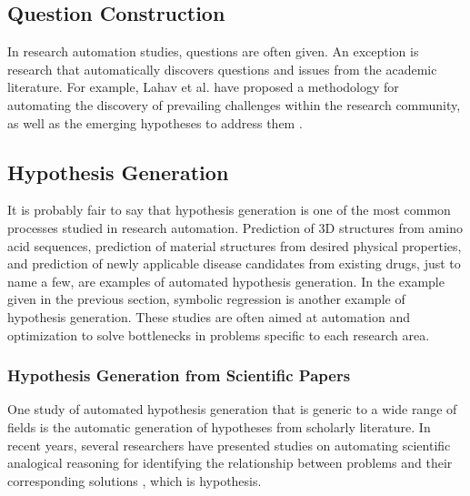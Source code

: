 
\subsection{Question Construction}
In research automation studies, questions are often given. An exception is research that automatically discovers questions and issues from the academic literature. For example, Lahav et al. have proposed a methodology for automating the discovery of prevailing challenges within the research community, as well as the emerging hypotheses to address them \cite{lahav2022search}.

\subsection{Hypothesis Generation}
It is probably fair to say that hypothesis generation is one of the most common processes studied in research automation. Prediction of 3D structures from amino acid sequences, prediction of material structures from desired physical properties, and prediction of newly applicable disease candidates from existing drugs, just to name a few, are examples of automated hypothesis generation. In the example given in the previous section, symbolic regression is another example of hypothesis generation. These studies are often aimed at automation and optimization to solve bottlenecks in problems specific to each research area.

\subsubsection{Hypothesis Generation from Scientific Papers}

One study of automated hypothesis generation that is generic to a wide range of fields is the automatic generation of hypotheses from scholarly literature. In recent years, several researchers have presented studies on automating scientific analogical reasoning for identifying the relationship between problems and their corresponding solutions \cite{kang2022augmenting,chan2018solvent}, which is hypothesis.



